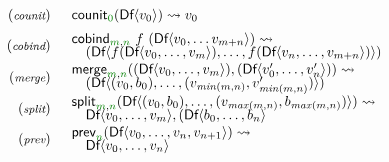 \begin{figure}[t]
\begin{equation*}
\begin{array}{rl}
{\footnotesize(\emph{counit})} & \begin{array}{l}
\ident{counit}_{\cclrd{0}}(\ident{Df} \langle v_0 \rangle)   \rightsquigarrow v_0
\end{array}
\\[0.5em]
{\footnotesize(\emph{cobind})} & \begin{array}{l}
\ident{cobind}_{\cclrd{m}, \cclrd{n}}~f~(\ident{Df}\langle v_0, \ldots v_{m+n} \rangle) \rightsquigarrow
\\[-0.25em]
\quad (\ident{Df}\langle f (\ident{Df}\langle v_0, \ldots, v_m \rangle), \ldots, f (\ident{Df}\langle v_{n}, \ldots, v_{m+n} \rangle) \rangle)
\end{array}
\\[0.5em]
{\footnotesize(\emph{merge})} & \begin{array}{l}
\ident{merge}_{\cclrd{m}, \cclrd{n}} ((\ident{Df}\langle v_0, \ldots, v_m \rangle), (\ident{Df}\langle v'_0, \ldots, v'_n\rangle)) \rightsquigarrow
\\[-0.25em]
\quad (\ident{Df}\langle (v_0, b_0), \ldots, (v_{\mathit{min}(m,n)}, v'_{\mathit{min}(m,n)}) \rangle)
\end{array}
\\[0.5em]
{\footnotesize(\emph{split})} & \begin{array}{l}
\ident{split}_{\cclrd{m}, \cclrd{n}} (\ident{Df}\langle (v_0, b_0), \ldots, (v_{\mathit{max}(m,n)}, b_{\mathit{max}(m,n)}) \rangle)  \rightsquigarrow
\\[-0.25em]
\quad \ident{Df}\langle v_0, \ldots, v_m \rangle, (\ident{Df}\langle b_0, \ldots, b_n\rangle
\end{array}
\\[0.5em]
{\footnotesize(\emph{prev})} & \begin{array}{l}
\ident{prev}_{\cclrd{n}} (\ident{Df}\langle v_0, \ldots, v_n, v_{n+1} \rangle) \rightsquigarrow
\\[-0.25em]
\quad \ident{Df}\langle v_0, \ldots, v_n \rangle
\end{array}
\end{array}
\end{equation*}

\label{fig:semantics-ext-df}
\end{figure}


